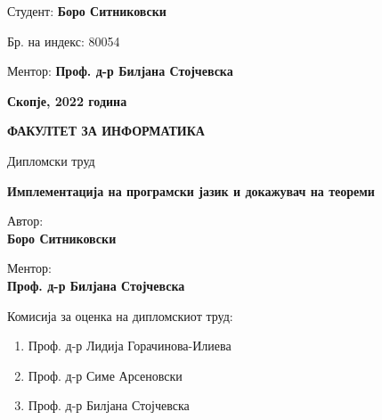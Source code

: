 \vspace{5em}

Студент: \textbf{Боро Ситниковски}

Бр. на индекс: 80054

\bigbreak

Ментор: \textbf{Проф. д-р Билјана Стојчевска}

\begin{center}

\vspace*{\fill}

\textbf{Скопје, 2022 година}

\newpage{}

\textbf{ФАКУЛТЕТ ЗА ИНФОРМАТИКА}

\end{center}

\vspace{5em}

Дипломски труд

\textbf{Имплементација на програмски јазик и докажувач на теореми}

\vspace{10em}

Автор: \\ \indent \textbf{Боро Ситниковски}

Ментор: \\ \indent \textbf{Проф. д-р Билјана Стојчевска}

\vspace*{\fill}

Комисија за оценка на дипломскиот труд:

\begin{enumerate}
\def\labelenumi{\arabic{enumi}.}
\item
  Проф. д-р Лидија Горачинова-Илиева
\item
  Проф. д-р Симе Арсеновски
\item
  Проф. д-р Билјана Стојчевска
\end{enumerate}

\setlength{\parskip}{0pt}
